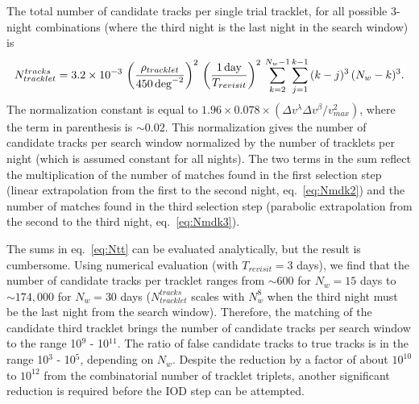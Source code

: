 The total number of candidate tracks per single trial tracklet, for all possible 3-night
combinations (where the third night is the last night in the search window) is
\begin{equation}
\label{eq:Ntt}
   N_{tracklet}^{tracks} = 3.2\times10^{-3} \, \left( \rho_{tracklet}  \over 450 \, {\rm deg}^{-2} \right)^2 \, \left({1 \,{\rm day}\over T_{revisit}}\right)^2 \, \sum_{k=2}^{N_w-1} \sum_{j=1}^{k-1} \, (k-j)^3 \, (N_w-k)^3.
\end{equation}
The normalization constant is equal to $1.96\times0.078\times(\Delta v^\lambda
\Delta v^\beta/v_{max}^2)$, where the term in parenthesis is $\sim0.02$. This
normalization gives the number of candidate tracks per search window normalized
by the number of tracklets per night (which is assumed constant for all nights).
The two terms in the sum reflect the multiplication of the number of matches found
in the first selection step (linear extrapolation from the first to the second night,
eq.~\ref{eq:Nmdk2}) and the number of matches found in the third selection step
(parabolic extrapolation from the second to the third night, eq.~\ref{eq:Nmdk3}).

The sums in eq.~\ref{eq:Ntt} can be evaluated analytically, but the result is cumbersome.
Using numerical evaluation (with $T_{revisit}=3$ days), we find that the number of candidate
tracks per tracklet ranges from $\sim600$ for $N_w=15$ days to $\sim174,000$ for
$N_w=30$ days ($N_{tracklet}^{tracks}$ scales with $N_w^8$ when the third night must be
the last night from the search window).
Therefore, the matching of the candidate third tracklet brings the number of candidate
tracks per search window to the range 10$^{9}$ - 10$^{11}$. The ratio of false candidate tracks
to true tracks is in the range 10$^{3}$ - 10$^{5}$, depending on $N_w$. Despite the reduction by
a factor of  about $10^{10}$ to $10^{12}$ from the combinatorial number of tracklet triplets,
another significant reduction is required before the IOD step can be attempted.


